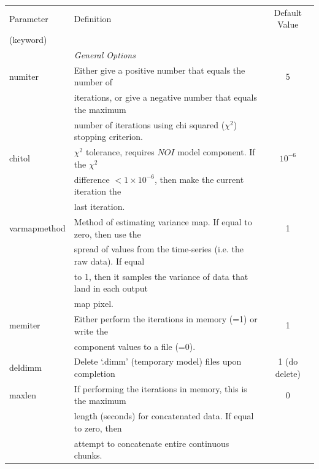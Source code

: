 \documentclass[twoside,11pt]{article}
\renewcommand{\_}{\texttt{\symbol{95}}}
\begin{document}
\begin{table}
\footnotesize
\centering
\begin{tabular}{llc}
\hline
Parameter        & Definition                                                         &  Default Value \\
(keyword)        &                                                                    & \\
\hline
                 & \multicolumn{2}{l}{\em General Options} \\
\hline
numiter          & Either give a positive number that equals the number of             & 5\\
                 & iterations, or give a negative number that equals the maximum       & \\
                 & number of iterations using chi squared ($\chi^2$) stopping criterion.& \\
chitol           & $\chi^2$ tolerance, requires $NOI$ model component. If the $\chi^2$ & $10^{-6}$\\
                 & difference $<1\times10^{-6}$, then make the current iteration the   & \\
                 & last iteration.                                                     & \\
varmapmethod     & Method of estimating variance map. If equal to zero, then use the   & 1 \\
                 & spread of values from the time-series (i.e. the raw data). If equal & \\
                 & to 1, then it samples the variance of data that land in each output & \\
                 & map pixel.                                                          & \\
memiter          & Either perform the iterations in memory (=1) or write the           &    1 \\
                 & component values to a file (=0).                                    & \\
deldimm          & Delete `.dimm' (temporary model) files upon completion            & 1 (do delete)\\
maxlen           & If performing the iterations in memory, this is the maximum         &    0 \\
                 & length (seconds) for concatenated data. If equal to zero, then      & \\
                 & attempt to concatenate entire continuous chunks.                    & \\

\end{tabular}
\end{table}
\end{document}
